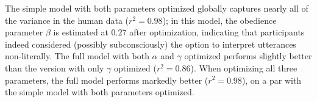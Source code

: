 \documentclass[11pt,a4paper]{article}
\newcommand{\gcs}[1]{\textcolor{blue}{[gcs: #1]}}
\begin{document}
The simple model with both parameters optimized globally captures nearly all of the variance in the human data ($r^2 = 0.98$); in this model, the obedience parameter $\beta$ is estimated at $0.27$ after optimization, indicating that participants indeed considered (possibly subconsciously) the option to interpret utterances non-literally. 
The full model with both $\alpha$ and $\gamma$ optimized performs slightly better than the version with only $\gamma$ optimized ($r^2 = 0.86$).
When optimizing all three parameters, the full model performs markedly better ($r^2 = 0.98$), on a par with the simple model with both parameters optimized. %
\end{document}
